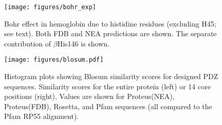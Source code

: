 \documentclass[a4paper,12pt]{article}
\begin{document}
\begin{figure}[h]
\centering
\texttt{[image: figures/bohr\_exp]} \\
\caption{Bohr effect in hemoglobin due to histidine residues (excluding H45; see text). Both FDB and NEA predictions
  are shown. The separate contribution of $\beta$His146 is shown. } \label{fig:bohr}  
\end{figure}


\begin{figure}[!h]
\begin{center}
\vspace*{-1cm}
\texttt{[image: figures/blosum.pdf]}
\end{center}
\caption[width=1cm]{\small Histogram plots showing Blosum similarity scores for designed PDZ sequences. Similarity scores for the
entire protein (left) or 14 core positions (right). Values are shown for Proteus(NEA), Proteus(FDB), Rosetta, and Pfam sequences
(all compared to the Pfam RP55 alignment).} \label{fig:blosum}
\end{figure}
\end{document}
